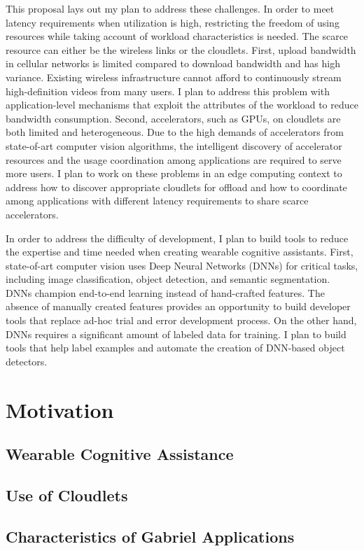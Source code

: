 This proposal lays out my plan to address these challenges. In order to meet
latency requirements when utilization is high, restricting the freedom of using
resources while taking account of workload characteristics is needed. The scarce
resource can either be the wireless links or the cloudlets. First, upload
bandwidth in cellular networks is limited compared to download bandwidth and has
high variance. Existing wireless infrastructure cannot afford to continuously
stream high-definition videos from many users. I plan to address this problem
with application-level mechanisms that exploit the attributes of the workload to
reduce bandwidth consumption. Second, accelerators, such as GPUs, on cloudlets
are both limited and heterogeneous. Due to the high demands of accelerators from
state-of-art computer vision algorithms, the intelligent discovery of
accelerator resources and the usage coordination among applications are required to
serve more users. I plan to work on these problems in an edge computing context
to address how to discover appropriate cloudlets for offload and how to
coordinate among applications with different latency requirements to share
scarce accelerators.

In order to address the difficulty of development, I plan to build tools to
reduce the expertise and time needed when creating wearable cognitive
assistants. First, state-of-art computer vision uses Deep Neural Networks (DNNs)
for critical tasks, including image classification, object detection, and
semantic segmentation. DNNs champion end-to-end learning instead of hand-crafted
features. The absence of manually created features provides an opportunity to
build developer tools that replace ad-hoc trial and error development process.
On the other hand, DNNs requires a significant amount of labeled data for training. I
plan to build tools that help label examples and automate the creation of
DNN-based object detectors.

\section{Motivation}
\subsection{Wearable Cognitive Assistance}
\subsection{Use of Cloudlets}
\subsection{Characteristics of Gabriel Applications}
